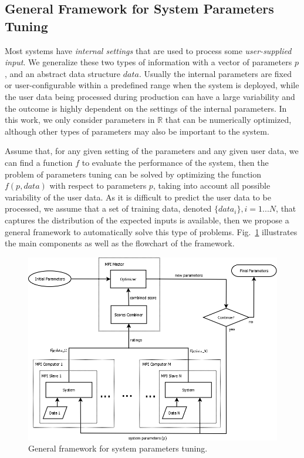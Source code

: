\documentclass[]{spie}  %
\begin{document}
\subsection{General Framework for System Parameters Tuning}

Most systems have \emph{internal settings} that are used to process some \emph{user-supplied input}. We generalize these two types of information with a vector of parameters $p$, and an abstract data structure $data$. Usually the internal parameters are fixed or user-configurable within a predefined range when the system is deployed, while the user data being processed during
production can have a large variability and the outcome is highly dependent on the settings of the internal parameters. In this work, we only consider parameters in $\mathbb{R}$ that can be numerically optimized, although other types of parameters may also be important to the system.

Assume that, for any given setting of the parameters and any given user data, we can find a function $f$ to evaluate the performance of the system, then the problem of parameters tuning can be solved by optimizing the function $f(p,data)$ with respect to parameters $p$, taking into account all possible variability of the user data. As it is difficult to predict the user data to be processed, we assume that a set of training data, denoted $\{data_i\}, i=1...N$, that captures the distribution of the expected inputs is available, then we propose a general framework to automatically solve this type of problems. Fig.~\ref{fig:spt_framework} illustrates the main components as well as the flowchart of the framework.

\begin{figure}
\begin{center}
\includegraphics[width=5in]{framework}
\end{center}
\caption{General framework for system parameters tuning.}
\label{fig:spt_framework}
\end{figure}
\end{document}
